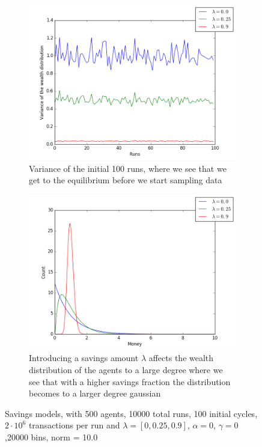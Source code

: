 \documentclass[a4paper,11pt]{article}
\begin{document}
{\begin{figure}[H]
	\centering
	\begin{subfigure}[t]{0.45\textwidth}
		\includegraphics[scale=0.4]{savinginit}
		\caption{Variance of the initial 100 runs, where we see that we get to the equilibrium before we start sampling data}
		\label{fig:savinginit}
	\end{subfigure}
	\begin{subfigure}[t]{0.45\textwidth}
		\includegraphics[scale=0.4]{Saving}
		\caption{Introducing a savings amount $\lambda$ affects the wealth distribution of the agents to a large degree where we see that with a higher savings fraction the distribution becomes to a larger degree gaussian}
		\label{fig:Saving}
	\end{subfigure}
	\caption{Savings models, with 500 agents, 10000 total runs, 100 initial cycles,  $2\cdot 10^{6}$ transactions per run and  $\lambda=[0,0.25,0.9]$, $\alpha=0$, $\gamma=0$,20000 bins, norm = 10.0}
	\label{fig:savings}
\end{figure}



}
\end{document}

